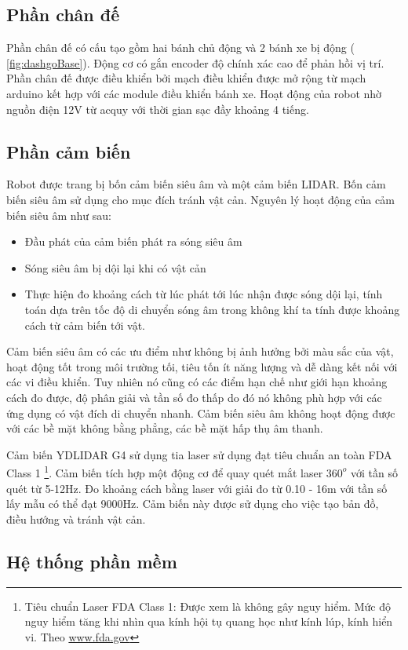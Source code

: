 \subsection{Phần chân đế}
Phần chân đế có cấu tạo gồm hai bánh chủ động và 2 bánh xe bị động (\figurename{ \ref{fig:dashgoBase}}). Động cơ có gắn encoder độ chính xác cao để phản hồi vị trí. Phần chân đế được điều khiển bởi mạch điều khiển được mở rộng từ mạch arduino kết hợp với các module điều khiển bánh xe. Hoạt động của robot nhờ nguồn điện 12V từ acquy với thời gian sạc đầy khoảng 4 tiếng.

\subsection{Phần cảm biến}
Robot được trang bị bốn cảm biến siêu âm và một cảm biến LIDAR. Bốn cảm biến siêu âm sử dụng cho mục đích tránh vật cản. Nguyên lý hoạt động của cảm biến siêu âm như sau:
\begin{itemize}
    \item Đầu phát của cảm biến phát ra sóng siêu âm
    \item Sóng siêu âm bị dội lại khi có vật cản
    \item Thực hiện đo khoảng cách từ lúc phát tới lúc nhận được sóng dội lại, tính toán dựa trên tốc độ di chuyển sóng âm trong không khí ta tính được khoảng cách từ cảm biến tới vật.
\end{itemize}
Cảm biến siêu âm có các ưu điểm như không bị ảnh hưởng bởi màu sắc của vật, hoạt động tốt trong môi trường tối, tiêu tốn ít năng lượng và dễ dàng kết nối với các vi điều khiển. Tuy nhiên nó cũng có các điểm hạn chế như giới hạn khoảng cách đo được, độ phân giải và tần số đo thấp do đó nó không phù hợp với các ứng dụng có vật đích di chuyển nhanh. Cảm biến siêu âm không hoạt động được với các bề mặt không bằng phẳng, các bề mặt hấp thụ âm thanh.

Cảm biến YDLIDAR G4 sử dụng tia laser sử dụng đạt tiêu chuẩn an toàn FDA Class 1 \footnote{Tiêu chuẩn Laser FDA Class 1: Được xem là không gây nguy hiểm. Mức độ nguy hiểm tăng khi nhìn qua kính hội tụ quang học như kính lúp, kính hiển vi. Theo \url{www.fda.gov}}.
Cảm biến tích hợp một động cơ để quay quét mắt laser ${360}^{o}$ với tần số quét từ 5-12Hz. Đo khoảng cách bằng laser với giải đo từ 0.10 - 16m với tần số lấy mẫu có thể đạt 9000Hz.
Cảm biến này được sử dụng cho việc tạo bản đồ, điều hướng và tránh vật cản.


\subsection{Hệ thống phần mềm} \label{sub:software-architecture}

